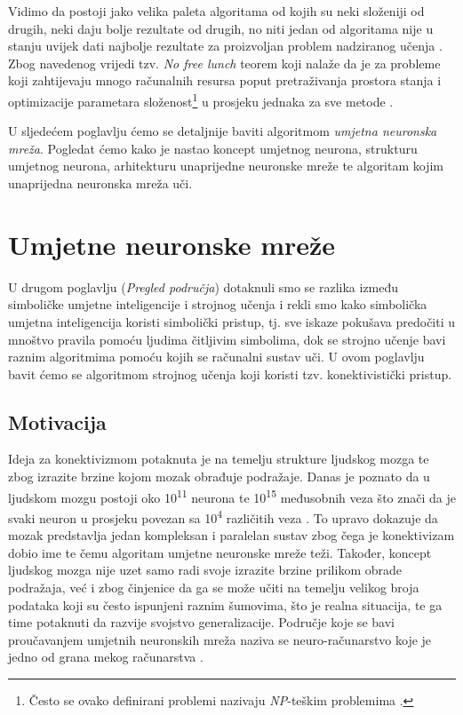 \documentclass[times, utf8, zavrsni]{fer}
\begin{document}
\bigskip

Vidimo da postoji jako velika paleta algoritama od kojih su neki složeniji od drugih, neki daju bolje rezultate od drugih, no niti jedan od algoritama
nije u stanju uvijek dati najbolje rezultate za proizvoljan problem nadziranog učenja \citep{wiki:SUP}. Zbog navedenog vrijedi tzv. \textit{No free lunch} teorem koji nalaže da je za probleme koji zahtijevaju mnogo računalnih resursa poput pretraživanja prostora stanja i optimizacije parametara složenost\footnote{Često se ovako definirani problemi nazivaju \textit{NP}-teškim problemima .} u prosjeku jednaka za sve metode \citep{wiki:NFL}.

\bigskip
\bigskip

U sljedećem poglavlju ćemo se detaljnije baviti algoritmom \textit{umjetna neuronska mreža}. Pogledat ćemo kako je nastao koncept umjetnog neurona, strukturu umjetnog neurona, arhitekturu unaprijedne neuronske mreže te algoritam kojim unaprijedna neuronska mreža uči.

\chapter{Umjetne neuronske mreže}
U drugom poglavlju (\textit{Pregled područja}) dotaknuli smo se razlika između simboličke umjetne inteligencije i strojnog učenja i rekli smo kako simbolička umjetna inteligencija koristi simbolički pristup, tj. sve iskaze pokušava predočiti u mnoštvo pravila pomoću ljudima čitljivim simbolima, dok se strojno učenje bavi raznim algoritmima pomoću kojih se računalni sustav uči. U ovom poglavlju bavit ćemo se algoritmom strojnog učenja koji koristi tzv. konektivistički pristup.

\section{Motivacija}
Ideja za konektivizmom  potaknuta je na temelju strukture ljudskog mozga te zbog izrazite brzine kojom mozak obrađuje podražaje. Danas je poznato da u ljudskom mozgu postoji oko 10\textsuperscript{11} neurona te 10\textsuperscript{15} međusobnih veza što znači da je svaki neuron u prosjeku povezan sa 10\textsuperscript{4} različitih veza \citep{cupicNENR}. To upravo dokazuje da mozak predstavlja jedan kompleksan i paralelan sustav zbog čega je konektivizam dobio ime te čemu algoritam umjetne neuronske mreže teži. Također, koncept ljudskog mozga nije uzet samo radi svoje izrazite brzine prilikom obrade podražaja, već i zbog činjenice da ga se može učiti na temelju velikog broja podataka koji su često ispunjeni raznim šumovima, što je realna situacija, te ga time potaknuti da razvije svojstvo generalizacije. Područje koje se bavi proučavanjem umjetnih neuronskih mreža naziva se neuro-računarstvo  koje je jedno od grana mekog računarstva .
\end{document}
